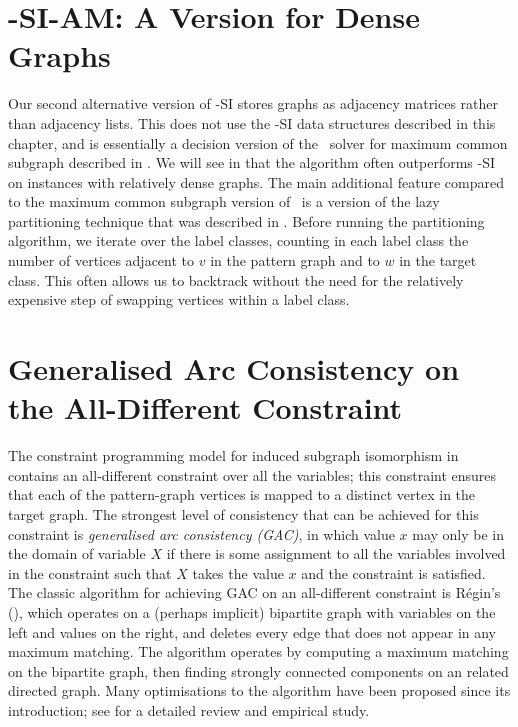 \section{\McSplit-SI-AM: A Version for Dense Graphs}\label{sec:mcsplit-si-adjmat}

Our second alternative version of \McSplit-SI 
stores graphs as adjacency matrices rather than
adjacency lists.  This does not use the \McSplit-SI data structures described
in this chapter, and is essentially a decision version of the \McSplit\ solver
for maximum common subgraph described in .
We will see in 
that the algorithm often outperforms \McSplit-SI on instances with
relatively dense graphs.  The main additional feature compared to the maximum
common subgraph version of \McSplit\ is a version of the lazy partitioning
technique that was described in .  Before
running the partitioning algorithm, we iterate over the label classes, counting
in each label class the number of vertices adjacent to $v$ in the pattern graph
and to $w$ in the target class.  This often allows us to backtrack without the
need for the relatively expensive step of swapping vertices within a label
class.

\section{Generalised Arc Consistency on the All-Different Constraint}\label{sec:mcsplit-si-gac}

The constraint programming model for induced subgraph isomorphism in 
contains an all-different
constraint over all the variables; this constraint ensures that each of the pattern-graph vertices
is mapped to a distinct vertex in the target graph.  The strongest level of consistency that can
be achieved for this constraint is \emph{generalised arc consistency (GAC)}, in which value
$x$ may only be in the domain of variable $X$ if there is some assignment to all
the variables involved in the constraint such that $X$ takes the value $x$
and the constraint is satisfied.
The classic algorithm for achieving GAC on an all-different constraint is R\'egin's
(\citeyear{DBLP:conf/aaai/Regin94}), which operates
on a (perhaps implicit) bipartite graph with variables on the left and values on the right, and 
deletes every edge that does not appear in any maximum matching.  The algorithm operates by computing
a maximum matching on the bipartite graph, then finding strongly connected components on an related directed
graph.  Many optimisations to the algorithm have been proposed since its introduction; see
\cite{DBLP:journals/ai/GentMN08} for a detailed review and empirical study.

